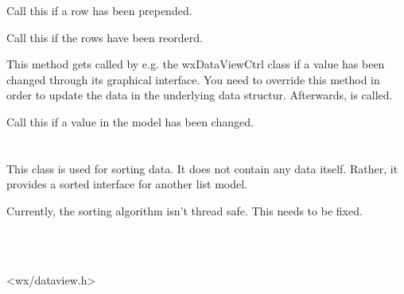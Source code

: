 
Call this if a row has been prepended.

\label{wxdataviewlistmodelrowsreordered}


Call this if the rows have been reorderd.

\label{wxdataviewlistmodelsetvalue}


This method gets called by e.g. the wxDataViewCtrl class if a 
value has been changed through its graphical interface. You
need to override this method in order to update the data in
the underlying data structur. Afterwards, 
 is called.


\label{wxdataviewlistmodelvaluechanged}


Call this if a value in the model has been changed.


\section{}\label{wxdataviewsortedlistmodel}

This class is used for sorting data. It does not contain any
data itself. Rather, it provides a sorted interface for 
another list model.

Currently, the sorting algorithm isn't thread safe. This needs
to be fixed.


\\
\\


<wx/dataview.h>

\label{wxdataviewsortedlistmodelwxdataviewsortedlistmodel}

